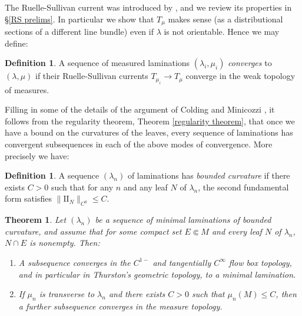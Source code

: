 \documentclass[reqno,11pt]{amsart}
\newcommand{\Two}{\mathrm{I\!I}}
\newcommand{\dfn}[1]{\emph{#1}\index{#1}}
\newtheorem{mainthm}{Theorem}
\theoremstyle{definition}
\newtheorem{definition}[theorem]{Definition}
\numberwithin{equation}{section}
\begin{document}
The Ruelle-Sullivan current was introduced by \cite{Ruelle75}, and we review its properties in \S\ref{RS prelims}.
In particular we show that $T_\mu$ makes sense (as a distributional sections of a different line bundle) even if $\lambda$ is not orientable.
Hence we may define:

\begin{definition}
A sequence of measured laminations $(\lambda_i, \mu_i)$ \dfn{converges} to $(\lambda, \mu)$ if their Ruelle-Sullivan currents $T_{\mu_i} \to T_\mu$ converge in the weak topology of measures.
\end{definition}


Filling in some of the details of the argument of Colding and Minicozzi \cite[Appendix B]{ColdingMinicozziIV}, it follows from the regularity theorem, Theorem \ref{regularity theorem}, that once we have a bound on the curvatures of the leaves, every sequence of laminations has convergent subsequences in each of the above modes of convergence.
More precisely we have:

\begin{definition}
A sequence $(\lambda_n)$ of laminations has \dfn{bounded curvature} if there exists $C > 0$ such that for any $n$ and any leaf $N$ of $\lambda_n$, the second fundamental form satisfies $\|\Two_N\|_{C^0} \leq C$.
\end{definition}

\begin{mainthm}\label{compactness theorem}
Let $(\lambda_n)$ be a sequence of minimal laminations of bounded curvature, and assume that for some compact set $E \Subset M$ and every leaf $N$ of $\lambda_n$, $N \cap E$ is nonempty. Then:
\begin{enumerate}
\item A subsequence converges in the $C^{1-}$ and tangentially $C^\infty$ flow box topology, and in particular in Thurston's geometric topology, to a minimal lamination.
\item If $\mu_n$ is transverse to $\lambda_n$ and there exists $C > 0$ such that $\mu_n(M) \leq C$, then a further subsequence converges in the measure topology.
\end{enumerate}
\end{mainthm}
\end{document}
